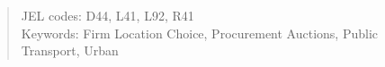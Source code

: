 \documentclass[12pt]{article}
\begin{document}
\begin{abstract}
		
		
		\noindent JEL codes: D44, L41, L92, R41\\
		Keywords: Firm Location Choice, Procurement Auctions, Public Transport, Urban 
		
		
	\end{abstract}
	\newpage
	
\end{document}
